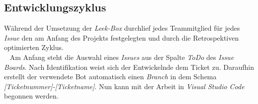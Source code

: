 \documentclass[10pt, a4paper]{article}
\begin{document}
\begin{onehalfspace}
  \subsection{Entwicklungszyklus}
    Während der Umsetzung der \textit{Leek-Box} durchlief jedes Teammitglied für jedes \textit{Issue} den am Anfang des Projekts festgelegten und
    durch die Retrospektiven optimierten Zyklus.
    \\~
    Am Anfang steht die Auswahl eines \textit{Issues} aus der Spalte \textit{ToDo} des \textit{Issue Boards}.
    Nach Identifikation weist sich der Entwickelnde dem Ticket zu. Daraufhin erstellt der verwendete Bot automatisch einen \textit{Branch}
    in dem Schema \textit{[Ticket\-nummer]-[Ticketname]}. Nun kann mit der Arbeit in \textit{Visual Studio Code} begonnen werden.
    \\~

\end{onehalfspace}
\end{document}
